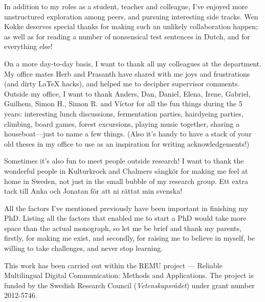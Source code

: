 In addition to my roles as a student, teacher and colleague, I've enjoyed
more unstructured exploration among peers, and pursuing interesting side tracks.
Wen Kokke deserves special thanks for making such an unlikely collaboration
happen; as well as for reading a number of nonsensical test sentences in Dutch,
and for everything else!

On a more day-to-day basis, I want to thank all my colleagues at the
department. My office mates Herb and Prasanth have shared with me joys
and frustrations (and dirty \LaTeX{} hacks), and helped me to decipher
supervisor comments. Outside my office, I want to thank Anders, Dan,
Daniel, Elena, Irene, Gabriel, Guilhem, Simon H., Simon R. and Víctor
for all the fun things during the 5 years: interesting lunch
discussions, fermentation parties, hairdyeing parties, climbing, board
games, forest excursions, playing music together, sharing a
houseboat---just to name a few things. (Also it's handy to have a
stack of your old theses in my office to use as an inspiration for
writing acknowledgements!)

Sometimes it's also fun to meet people outside research! I want to
thank the wonderful people in Kulturkrock and Chalmers sångkör for
making me feel at home in Sweden, not just in the small bubble of my
research group. Ett extra tack till Anka och Jonatan för att ni rättat
min svenska!

All the factors I've mentioned previously have been important in finishing
my PhD. Listing all the factors that enabled me to start a PhD would take
more space than the actual monograph, so let me be brief and thank my parents,
firstly, for making me exist, and secondly, for raising me to believe in myself,
be willing to take challenges, and never stop learning.

\vfill\noindent
This work has been carried out within the REMU project — Reliable Multilingual Digital Communication: Methods and Applications.
The project is funded by the Swedish Research Council (\emph{Vetenskapsrådet}) under grant number 2012-5746.
